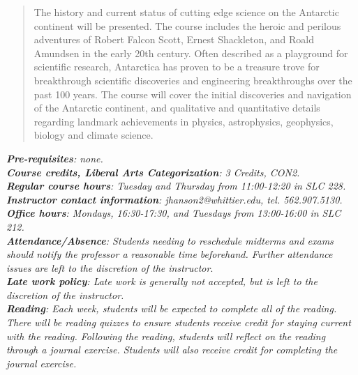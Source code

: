 \documentclass[10pt]{article}
\begin{document}
\maketitle

\begin{abstract}
The history and current status of cutting edge science on the Antarctic continent will be presented. The course includes the heroic and perilous adventures of Robert Falcon Scott, Ernest Shackleton, and Roald Amundsen in the early 20th century. Often described as a playground for scientific research, Antarctica has proven to be a treasure trove for breakthrough scientific discoveries and engineering breakthroughs over the past 100 years. The course will cover the initial discoveries and navigation of the Antarctic continent, and qualitative and quantitative details regarding landmark achievements in physics, astrophysics, geophysics, biology and climate science.
\end{abstract}
\noindent
\textit{\textbf{Pre-requisites}: none.} \\
\textit{\textbf{Course credits, Liberal Arts Categorization}: 3 Credits, CON2.} \\
\textit{\textbf{Regular course hours}: Tuesday and Thursday from 11:00-12:20 in SLC 228.} \\
\textit{\textbf{Instructor contact information}: jhanson2@whittier.edu, tel. 562.907.5130.} \\
\textit{\textbf{Office hours}: Mondays, 16:30-17:30, and Tuesdays from 13:00-16:00 in SLC 212.} \\
\textit{\textbf{Attendance/Absence}: Students needing to reschedule midterms and exams should notify the professor a reasonable time beforehand. Further attendance issues are left to the discretion of the instructor}.\\ 
\textit{\textbf{Late work policy}: Late work is generally not accepted, but is left to the discretion of the instructor.} \\
\textit{\textbf{Reading}: Each week, students will be expected to complete all of the reading.  There will be reading quizzes to ensure students receive credit for staying current with the reading.  Following the reading, students will reflect on the reading through a journal exercise.  Students will also receive credit for completing the journal exercise.}
\end{document}

